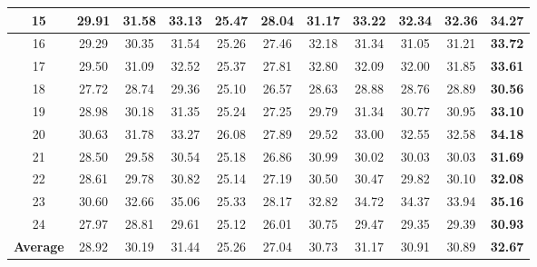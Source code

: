 \begin{table}[!htbp]
\begin{center}
\begin{tabular}{|c||c|c|c|c|c|c|c|c|c|c|}
\\
\hline
15& 29.91 & 31.58 & 33.13 & 25.47 & 28.04 & 31.17 & 33.22 & 32.34 & 32.36 & \textbf{34.27}
\\
\hline
16& 29.29 & 30.35 & 31.54 & 25.26 & 27.46 & 32.18 & 31.34 & 31.05 & 31.21 & \textbf{33.72}
\\
\hline
17& 29.50 & 31.09 & 32.52 & 25.37 & 27.81 & 32.80 & 32.09 & 32.00 & 31.85 & \textbf{33.61}
\\
\hline
18& 27.72 & 28.74 & 29.36 & 25.10 & 26.57 & 28.63 & 28.88 & 28.76 & 28.89 & \textbf{30.56}
\\
\hline
19& 28.98 & 30.18 & 31.35 & 25.24 & 27.25 & 29.79 & 31.34 & 30.77 & 30.95 & \textbf{33.10}
\\
\hline
20& 30.63 & 31.78 & 33.27 & 26.08 & 27.89 & 29.52 & 33.00 & 32.55 & 32.58 & \textbf{34.18}
\\
\hline
21& 28.50 & 29.58 & 30.54 & 25.18 & 26.86 & 30.99 & 30.02 & 30.03 & 30.03 & \textbf{31.69}
\\
\hline
22& 28.61 & 29.78 & 30.82 & 25.14 & 27.19 & 30.50 & 30.47 & 29.82 & 30.10 & \textbf{32.08}
\\
\hline
23& 30.60 & 32.66 & 35.06 & 25.33 & 28.17 & 32.82 & 34.72 & 34.37 & 33.94 & \textbf{35.16}
\\
\hline
24& 27.97 & 28.81 & 29.61 & 25.12 & 26.01 & 30.75 & 29.47 & 29.35 & 29.39 & \textbf{30.93}
\\
\hline
\textbf{Average}
& 28.92 & 30.19 & 31.44 & 25.26 & 27.04 & 30.73 & 31.17 & 30.91 & 30.89 & \textbf{32.67}
\\
\hline
\end{tabular}
\end{center}
\end{table}

